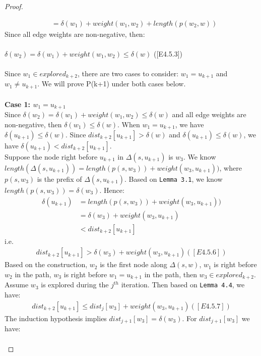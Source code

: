 \begin{proof}
\begin{itemize}
\begin{enumerate}
\begin{align*}
              &= \delta(w_1) + weight(w_1, w_2) + length(p(w_2, w))
  \end{align*}
  Since all edge weights are non-negative, then: 
  \\\\
    \tab $\delta(w_2) = \delta(w_1) + weight(w_1, w_2) \leq \delta(w)$ ([E4.5.3])
  \\\\
  Since $w_1 \in explored_{k+2}$, there are two cases to consider: $w_1 =u_{k+1}$ and $w_1 \neq u_{k+1}$. We will prove P(k+1) under both cases below. 
  \\\\
  \textbf{Case 1: $w_1 = u_{k+1}$}
  \\
  Since $\delta(w_2) = \delta(w_1) + weight(w_1, w_2) \leq \delta(w)$ and all edge weights are non-negative, then $\delta(w_1) \leq \delta(w)$. When $w_1 = u_{k+1}$, we have $\delta(u_{k+1}) \leq \delta(w)$. Since $dist_{k+2}[u_{k+1}] > \delta(w)$ and $\delta(u_{k+1}) \leq \delta(w)$, we have $\delta(u_{k+1}) < dist_{k+2}[u_{k+1}]$.
  \\
  Suppose the node right before $u_{k+1}$ in $\Delta(s, u_{k+1})$ is $w_3$. We know $length(\Delta(s, u_{k+1})) = length(p(s, w_3)) + weight(w_3, u_{k+1}))$, where $p(s, w_3)$ is the prefix of $\Delta(s, u_{k+1})$. Based on \texttt{Lemma 3.1}, we know $length(p(s, w_3)) = \delta(w_3)$. Hence: 
  \begin{align*}
    \delta(u_{k+1}) &= length(p(s, w_3)) + weight(w_3, u_{k+1})) \\
                    &= \delta(w_3) + weight(w_3, u_{k+1}) \\
                    &< dist_{k+2}[u_{k+1}]
  \end{align*}
  i.e.
  \begin{align*}
    dist_{k+2}[u_{k+1}] > \delta(w_3) + weight(w_3, u_{k+1}) ([E4.5.6])
  \end{align*}
  Based on the construction, $w_2$ is the first node along $\Delta(s,w)$, $w_1$ is right before $w_2$ in the path, $w_3$ is right before $w_1 = u_{k+1}$ in the path, then $w_3 \in explored_{k+2}$. Assume $w_3$ is explored during the $j^{th}$ iteration. Then based on \texttt{Lemma 4.4}, we have: 
  \begin{align*}
    dist_{k+2}[u_{k+1}] \leq dist_j[w_3] + weight(w_3, u_{k+1}) ([E4.5.7])
  \end{align*}
  The induction hypothesis implies $dist_{j+1}[w_3] = \delta(w_3)$. For $dist_{j+1}[w_3]$ we have: 
  \begin{align*}

\end{align*}
\end{enumerate}
\end{itemize}
\end{proof}
